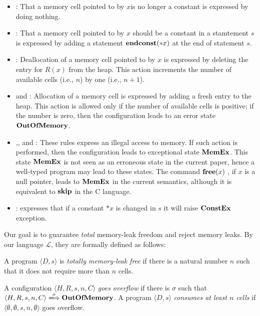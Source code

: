 \begin{itemize}
\item {}: That a memory cell pointed to by \(x\)is no
  longer a constant is expressed by doing nothing.
\item {}: That a memory cell pointed to by \(x\) should
  be a constant in a stamtement \(s\) is expressed by adding a
  statement \(\mathbf{endconst}(*x)\) at the end of statement \(s\).
\item {}: Deallocation of a memory cell pointed to by \(x\)
  is expressed by deleting the entry for \(R(x)\) from the heap.  This
  action increments the number of available cells (i.e., \(n\)) by one
  (i.e., \(n+1\)).
\item {} and : Allocation of a memory
  cell is expressed by adding a fresh entry to the heap.  This action is
  allowed only if the number of available cells is positive; if the
  number is zero, then the configuration leads to an error state
  \(\mathbf{OutOfMemory}\).
\item {},, and
   : These rules express an illegal access to memory.
  If such action is performed, then the configuration leads to
  exceptional state \(\mathbf{MemEx}\).  This state \(\mathbf{MemEx}\) is not seen as
  an erroneous state in the current paper, hence a well-typed program
  may lead to these states.  The command \(\mathbf{free}(x)\;\), if \(x\) is a null
  pointer, leads to \(\mathbf{MemEx}\) in the current semantics, although it
  is equivalent to \(\mathbf{skip}\) in the C language.
\item {}:  expresses that if a constant \(*x\)
  is changed in \(s\) it will raise \(\mathbf{ConstEx}\) exception.
\end{itemize}

Our goal is to guarantee \emph{total} memory-leak freedom and reject
memory leaks. By our language \(\mathcal{L}\), they are formally
defined as follows:
\begin{myDef}
\label{df:ml}
A program \(\langle D, s \rangle\) is \emph{totally memory-leak free}
if there is a natural number \(n\) such that it does not require more
than \(n\) cells.
\end{myDef}
\begin{myDef}
\label{df:ml}
A configuration \(\langle H, R, s, n, C \rangle\) \emph{goes overflow} if
there is \(\sigma\) such that \(\langle H, R, s, n, C \rangle
\xLongrightarrow{\sigma} \OVERFLOW\).  A program \(\langle D, s
\rangle\) \emph{consumes at least \(n\) cells} if \(\langle \emptyset,
\emptyset, s, n, \emptyset \rangle\) goes overflow.  
\end{myDef}


